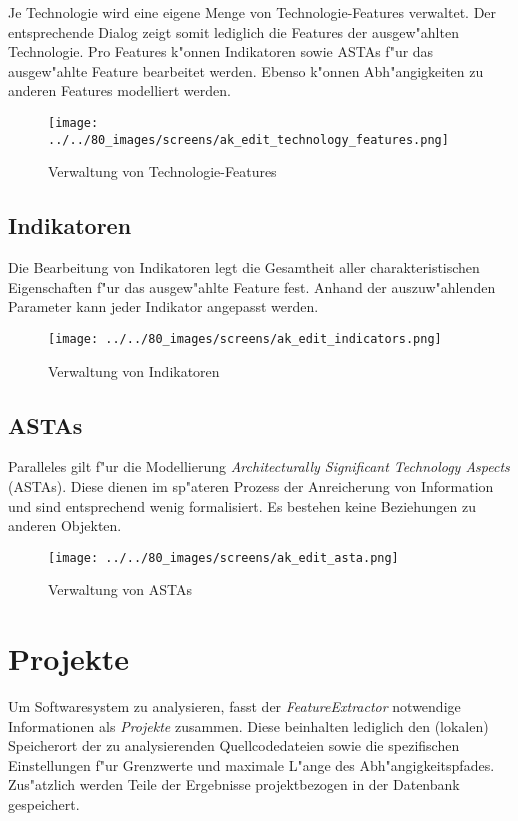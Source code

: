 \documentclass{proc}
\begin{document}
	Je Technologie wird eine eigene Menge von Technologie-Features verwaltet.
	Der entsprechende Dialog zeigt somit lediglich die Features der ausgew"ahlten Technologie.
	Pro Features k"onnen Indikatoren sowie ASTAs f"ur das ausgew"ahlte Feature bearbeitet werden.
	Ebenso k"onnen Abh"angigkeiten zu anderen Features modelliert werden.
	
	\begin{figure}[h!]
		\centering
		\caption{Verwaltung von Technologie-Features}
		\texttt{[image: ../../80\_images/screens/ak\_edit\_technology\_features.png]}
	\end{figure}
	
	\subsection{Indikatoren}
	
	Die Bearbeitung von Indikatoren legt die Gesamtheit aller charakteristischen Eigenschaften f"ur das ausgew"ahlte Feature fest.
	Anhand der auszuw"ahlenden Parameter kann jeder Indikator angepasst werden.
	
	\begin{figure}[h!]
		\centering
		\caption{Verwaltung von Indikatoren}
		\texttt{[image: ../../80\_images/screens/ak\_edit\_indicators.png]}
	\end{figure}
	
	\subsection{ASTAs}
	
	Paralleles gilt f"ur die Modellierung \textit{Architecturally Significant Technology Aspects} (ASTAs).
	Diese dienen im sp"ateren Prozess der Anreicherung von Information und sind entsprechend wenig formalisiert.
	Es bestehen keine Beziehungen zu anderen Objekten.
	
	\begin{figure}[h!]
		\centering
		\caption{Verwaltung von ASTAs}
		\texttt{[image: ../../80\_images/screens/ak\_edit\_asta.png]}
	\end{figure}
	
	\section{Projekte}
	
	Um Softwaresystem zu analysieren, fasst der \textit{FeatureExtractor} notwendige Informationen als \textit{Projekte} zusammen.
	Diese beinhalten lediglich den (lokalen) Speicherort der zu analysierenden Quellcodedateien sowie die spezifischen Einstellungen f"ur Grenzwerte und maximale L"ange des Abh"angigkeitspfades.
	Zus"atzlich werden Teile der Ergebnisse projektbezogen in der Datenbank gespeichert.
	
\end{document}
